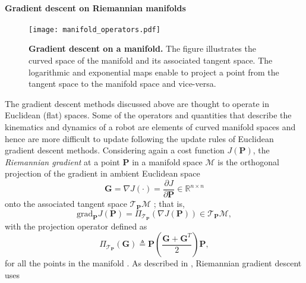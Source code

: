 \paragraph*{Gradient descent on Riemannian manifolds}
\begin{figure*}[!t]
	\centering	
	\hspace*{\fill}
	\texttt{[image: manifold\_operators.pdf]}
	\hspace*{\fill}	
	\caption[] {\label{fig:manifold_operators}\textbf{Gradient descent on a manifold.} The figure illustrates the curved space of the manifold and its associated tangent space. The logarithmic and exponential maps enable to project a point from the tangent space to the manifold space and vice-versa.}
\end{figure*}
The gradient descent methods discussed above are thought to operate in Euclidean (flat) spaces. Some of the operators and quantities that describe the kinematics and dynamics of a robot are elements of curved manifold spaces and hence are more difficult to update following the update rules of Euclidean gradient descent methods. Considering again a cost function $J\left(\bm{P}\right)$, the \emph{Riemannian gradient} at a point $\bm{P}$ in a manifold space $\mathcal{M}$ is the orthogonal projection of the gradient in ambient Euclidean space
\begin{equation}
	\bm{G} = \nabla J(\cdot)=\frac{\partial J}{\partial \bm{P}}\in \mathbb{R}^{n \times n}
\end{equation}
onto the associated tangent space $\mathcal{T}_{\bm{P}}\mathcal{M}$ \cite{Boumal2014Optimizationestimationmanifolds.}; that is,
\begin{equation}
	\text{grad}_{\bm{P}}J(\bm{P}) = \Pi_{ \mathcal{T}_{\bm{P}}}\left(\nabla J(\bm{P})\right) \in \mathcal{T}_{\bm{P}}\mathcal{M},
\end{equation} 
with the projection operator defined as
\begin{equation}
	\Pi_{ \mathcal{T}_{\bm{P}}}(\bm{G})\triangleq\bm{P}\left(\frac{\bm{G}+\bm{G}^T}{2}\right)\bm{P},
\end{equation} 
for all the points in the manifold \cite{Brooks2019Riemannianbatchnormalization}. As described in \cite{Bonnabel2013Stochasticgradientdescent}, Riemannian gradient descent uses
